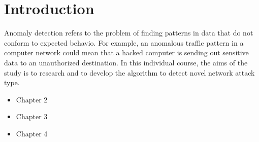 \chapter{Introduction}

Anomaly detection refers to the problem of finding patterns in data that do not conform to expected behavio. For example, an anomalous traffic pattern in a computer network could mean that a hacked computer is sending out sensitive data to an unauthorized destination. In this individual course, the aims of the study is to research and to develop the algorithm to detect novel network attack type.

\begin{itemize}
\item Chapter 2
\item Chapter 3
\item Chapter 4
\end{itemize}
